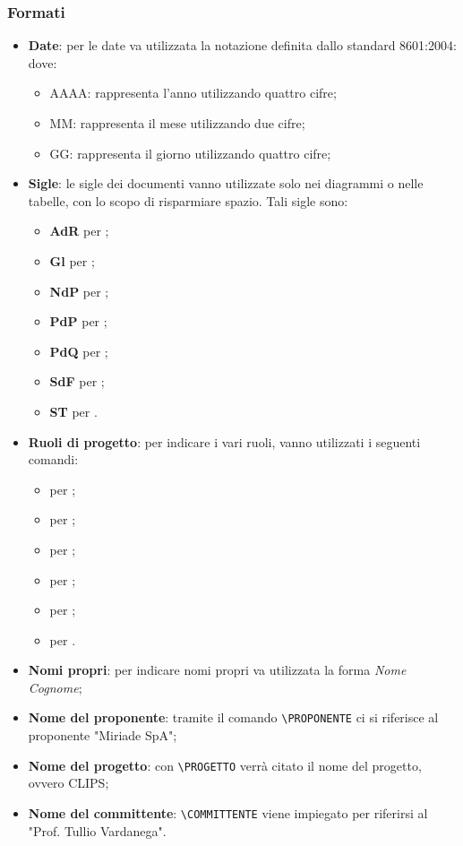 		\subsubsection{Formati}
		\begin{itemize}
			\item \textbf{Date}: per le date va utilizzata la notazione definita dallo standard  8601:2004:
			dove:
			\begin{itemize}
				\item AAAA: rappresenta l'anno utilizzando quattro cifre;
				\item MM: rappresenta il mese utilizzando due cifre;
				\item GG: rappresenta il giorno utilizzando quattro cifre;
			\end{itemize}
			\item \textbf{Sigle}: le sigle dei documenti vanno utilizzate solo nei diagrammi o nelle tabelle, con lo scopo di risparmiare spazio. Tali sigle sono:
			\begin{itemize}
				\item \textbf{AdR} per \ARdoc;
				\item \textbf{Gl} per \Gldoc;
				\item \textbf{NdP} per \NPdoc;
				\item \textbf{PdP} per \PPdoc;
				\item \textbf{PdQ} per \PQdoc;
				\item \textbf{SdF} per \SFdoc;
				\item \textbf{ST} per \STdoc.
			\end{itemize}	
			\item \textbf{Ruoli di progetto}: per indicare i vari ruoli, vanno utilizzati i seguenti comandi:
			\begin{itemize}
				\item {} per \AM;
				\item {} per \AN;
				\item {} per \PR;
				\item {} per \PRJ;
				\item {} per \RES;
				\item {} per \VER.
			\end{itemize}
				\item \textbf{Nomi propri}: per indicare nomi propri va utilizzata la forma \textit{Nome Cognome};
				\item \textbf{Nome del proponente}: tramite il comando \texttt{\textbackslash PROPONENTE} ci si riferisce al proponente "Miriade SpA";
				\item \textbf{Nome del progetto}: con \texttt{\textbackslash PROGETTO} verrà citato il nome del progetto, ovvero CLIPS;
				\item \textbf{Nome del committente}: \texttt{\textbackslash COMMITTENTE} viene impiegato per riferirsi al "Prof. Tullio Vardanega".
			\end{itemize}
